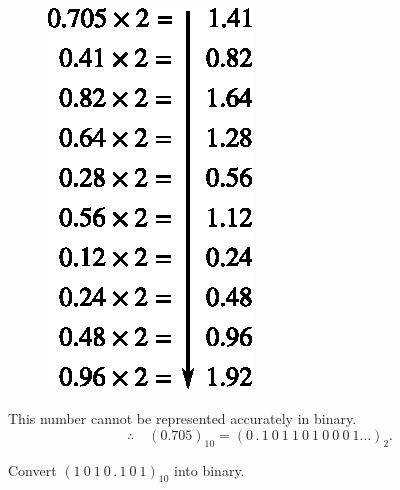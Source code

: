\begin{solution}
~
\begin{figure}[H]
\centering
\includegraphics{chap5/div7.eps}
\end{figure}

This number cannot be represented accurately in binary.
$$
\therefore\quad (0.705)_{10}=(0\,.\,1~0~1~1~0~1~0~0~0~1\ldots)_{2}.
$$
\end{solution}

\begin{problem}\label{prob5.8}
Convert $(1~0~1~0\,.\,1~0~1)_{10}$ into binary.
\end{problem}

